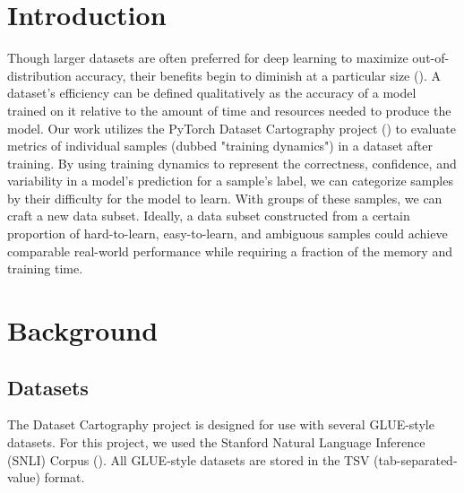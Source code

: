 \documentclass[11pt, a4paper, twocolumn]{article}
\begin{document}
	
	
	\twocolumn[
	\begin{@twocolumnfalse}
		\maketitle
		\begin{abstract}
			\abstracttext
			\newline
			\newline
		\end{abstract}
	\end{@twocolumnfalse}
	]
	
	
	\section{Introduction}
	
	Though larger datasets are often preferred for deep learning to maximize out-of-distribution accuracy, their benefits begin to diminish at a particular size (\cite{banko-brill-2001-mitigating}). A dataset's efficiency can be defined qualitatively as the accuracy of a model trained on it relative to the amount of time and resources needed to produce the model. Our work utilizes the PyTorch Dataset Cartography project (\cite{swayamdipta2020dataset}) to evaluate metrics of individual samples (dubbed "training dynamics") in a dataset after training. By using training dynamics to represent the correctness, confidence, and variability in a model's prediction for a sample's label, we can categorize samples by their difficulty for the model to learn. With groups of these samples, we can craft a new data subset. Ideally, a data subset constructed from a certain proportion of hard-to-learn, easy-to-learn, and ambiguous samples could achieve comparable real-world performance while requiring a fraction of the memory and training time.
	
	\section{Background}
	
	\subsection{Datasets}
	
	The Dataset Cartography project is designed for use with several GLUE-style datasets. For this project, we used the Stanford Natural Language Inference (SNLI) Corpus (\cite{snli:emnlp2015}). All GLUE-style datasets are stored in the TSV (tab-separated-value) format.
	
\end{document}
